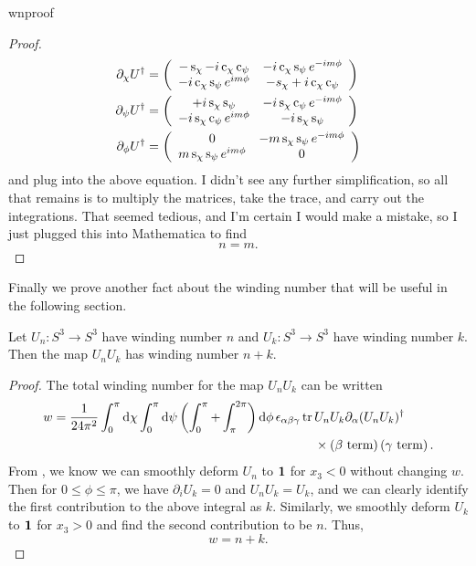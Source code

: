 \begin{proposition}{}{wnproof}
\begin{proof}
\begin{equation*}
\begin{aligned}
    \partial_\chi U^\dagger
             &=\left(\begin{array}{cc}
                  -\operatorname{s}_\chi-i\operatorname{c}_\chi\operatorname{c}_\psi  & -i\operatorname{c}_\chi\operatorname{s}_\psi e^{-im\phi}\\
                 -i\operatorname{c}_\chi\operatorname{s}_\psi e^{im\phi} & -s_\chi+i\operatorname{c}_\chi\operatorname{c}_\psi 
                \end{array}\right)\\
    \partial_\psi U^\dagger
             &=\left(\begin{array}{cc}
                  +i\operatorname{s}_\chi\operatorname{s}_\psi & -i\operatorname{s}_\chi\operatorname{c}_\psi e^{-im\phi}\\
                 -i\operatorname{s}_\chi\operatorname{c}_\psi e^{im\phi} & -i\operatorname{s}_\chi\operatorname{s}_\psi 
                \end{array}\right)\\
    \partial_\phi U^\dagger
             &=\left(\begin{array}{cc}
                  0 & -m\operatorname{s}_\chi\operatorname{s}_\psi e^{-im\phi}\\
                 m\operatorname{s}_\chi\operatorname{s}_\psi e^{im\phi} & 0 
                \end{array}\right)
  \end{aligned}
  \end{equation*}
  and plug into the above equation. I didn't see any further simplification,
  so all that remains is to multiply the matrices, take the trace, and
  carry out the integrations. That seemed tedious, and I'm certain I would
  make a mistake, so I just plugged this into Mathematica to find 
  $$n=m.$$
\end{proof}\end{proposition}

Finally we prove another fact about the winding number that will be useful
in the following section.
\begin{proposition}{}{}
  Let $U_n:S^3\to S^3$ have winding number $n$ and
  $U_k:S^3\to S^3$ have winding number $k$. Then the map
  $U_n U_k$ has winding number $n+k$.
  \begin{proof}
    The total winding number for the map $U_n U_k$ can be written
    \begin{equation*}\begin{aligned}
      w=\frac{1}{24\pi^2}\int_0^\pi\dd{\chi}\int_0^\pi\dd{\psi}
          \left(\int_0^\pi+\int_\pi^{2\pi}\right)\dd{\phi}
          \epsilon_{\alpha\beta\gamma}\tr\,
          &U_nU_k\partial_\alpha(U_nU_k)^\dagger\\
          &\times\left(\text{$\beta$ term}\right)
          \left(\text{$\gamma$ term}\right).
    \end{aligned}\end{equation*}
    From , we know we can smoothly
    deform $U_n$ to ${\mathbf 1}$ for $x_3<0$ without changing $w$.
    Then for $0\leq\phi\leq\pi$, we have
    $\partial_i U_k=0$ and $U_n U_k=U_k$, and we can clearly identify
    the first contribution to the above integral as $k$.
    Similarly, we smoothly deform $U_k$ to ${\mathbf 1}$ for
    $x_3>0$ and find the second contribution to be $n$. Thus,
    $$w=n+k.$$
  \end{proof}
\end{proposition}



